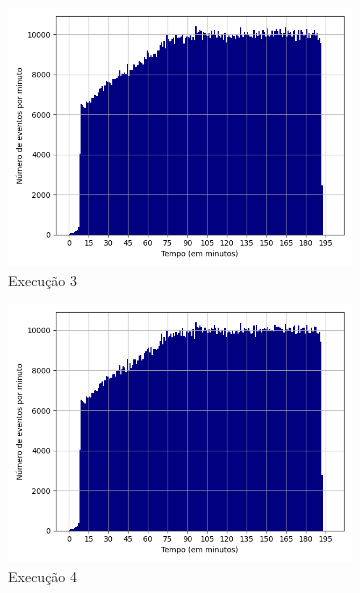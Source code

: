 \begin{figure}[h!]
\begin{subfigure}{.5\textwidth}
  \centering
  \includegraphics[width=\linewidth]{figuras/graphics/histogram_vazao_8-dez-is.png} 
  \caption{Execução 3}
  \label{fig:histv-8-dez-is}
\end{subfigure}
\begin{subfigure}{.5\textwidth}
  \centering
  \includegraphics[width=\linewidth]{figuras/graphics/histogram_vazao_9-dez-is.png}  
  \caption{Execução 4}
  \label{fig:histv-9-dez-is}
\end{subfigure}
\begin{subfigure}{.5\textwidth}
  \centering

\end{subfigure}
\end{figure}
